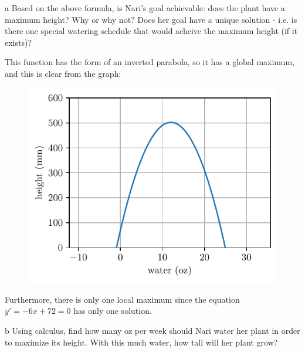 \documentclass[expanded]{pset}
\begin{document}
\begin{parts}
  \begin{part}{a}
    Based on the above formula, is Nari's goal achievable: does the plant have a maximum height? Why or why not? Does her goal have a unique solution - i.e. is there one special watering schedule that would acheive the maximum height (if it exists)?

  \end{part}

  This function has the form of an inverted parabola, so it has a global maximum, and this is clear from the graph:

  \begin{figure}[ht]
    \centering
    \includegraphics[]{2a.pdf}
  \end{figure}\noindent
  Furthermore, there is only one local maximum since the equation $y'=-6x+72=0$ has only one solution.

  \begin{part}{b}
    Using calculus, find how many oz per week should Nari water her plant in order to maximize its height. With this much water, how tall will her plant grow?

  \end{part}


\end{parts}
\end{document}
